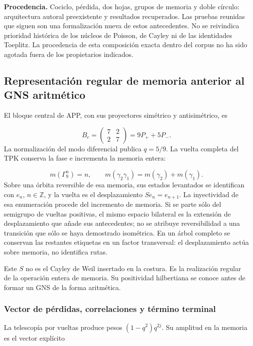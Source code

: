 \textbf{Procedencia.} Cociclo, pérdida, dos hojas, grupos de memoria y doble círculo: arquitectura autoral preexistente y resultados recuperados. Las pruebas reunidas que siguen son una formalización nueva de estos antecedentes. No se reivindica prioridad histórica de los núcleos de Poisson, de Cayley ni de las identidades Toeplitz. La procedencia de esta composición exacta dentro del corpus no ha sido agotada fuera de los propietarios indicados.


\subsection{Representación regular de memoria anterior al GNS aritmético}
\label{viii:tm-add-m2}
El bloque central de APP, con sus proyectores simétrico y antisimétrico, es

\[
B_c=\begin{pmatrix}7&2\\2&7\end{pmatrix}
=9P_++5P_-.
\]
La normalización del modo diferencial publica \(q=5/9\). La vuelta completa del TPK conserva la fase e incrementa la memoria entera:

\[
m(\Gamma_9^n)=n,\qquad
m(\gamma_2\gamma_1)=m(\gamma_2)+m(\gamma_1).
\]
Sobre una órbita reversible de esa memoria, sus estados levantados se identifican con \(e_n\), \(n\in\mathbb Z\), y la vuelta es el desplazamiento \(Se_n=e_{n+1}\). La inyectividad de esa enumeración procede del incremento de memoria. Si se parte sólo del semigrupo de vueltas positivas, el mismo espacio bilateral es la extensión de desplazamiento que añade sus antecedentes; no se atribuye reversibilidad a una transición que sólo se haya demostrado isométrica. En un árbol completo se conservan las restantes etiquetas en un factor transversal: el desplazamiento actúa sobre memoria, no identifica rutas.

Este \(S\) no es el Cayley de Weil insertado en la costura. Es la realización regular de la operación entera de memoria. Su positividad hilbertiana se conoce antes de formar un GNS de la forma aritmética.


\subsubsection{Vector de pérdidas, correlaciones y término terminal}
\label{viii:tm-add-m2-1}
La telescopía por vueltas produce pesos \((1-q^2)q^{2j}\). Su amplitud en la memoria es el vector explícito

